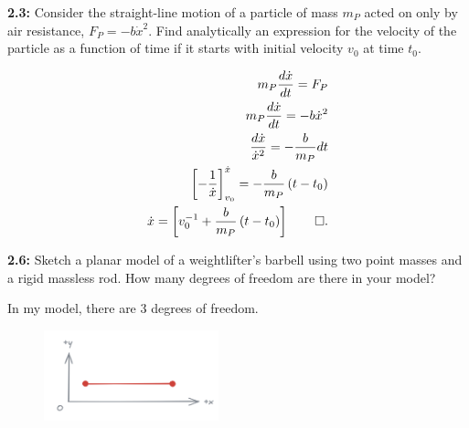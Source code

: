 \begin{homeworkProblem}

	\textbf{2.3:} Consider the straight-line motion of a particle of mass \( m_{P} \) acted on only by air resistance, \( F_{P} = - b \dot{x}^{2} \). Find analytically an expression for the velocity of the particle as a function of time if it starts with initial velocity \( v_{0} \) at time \( t_{0} \).

	\solution

	\begin{align*}
		m_{P} \frac{d\dot{x}}{dt}                             = F_{P}                                     \\
		m_{P} \frac{d\dot{x}}{dt}                             = -b\dot{x}^{2}                             \\
		\frac{d\dot{x}}{\dot{x}^2}                            = - \frac{b}{m_{P}} dt                      \\
		\left[ - \frac{1}{\dot{x}} \right]^{\dot{x}}_{v_{0}}  = - \frac{b}{m_{P}}\left( t - t_{0} \right) \\
		\dot{x}                                               = \left[ v_{0}^{-1} + \frac{b}{m_{P}} \left( t - t_{0} \right) \right] \qed
		.\end{align*}


\end{homeworkProblem}

\begin{homeworkProblem}

	\textbf{2.6:} Sketch a planar model of a weightlifter's barbell using two point masses and a rigid massless rod. How many degrees of freedom are there in your model?

	\solution

	In my model, there are 3 degrees of freedom.
	\begin{figure}[ht]
		\begin{center}
			\includegraphics[width=0.45\textwidth]{images/s5.png}
		\end{center}
	\end{figure}

\end{homeworkProblem}

